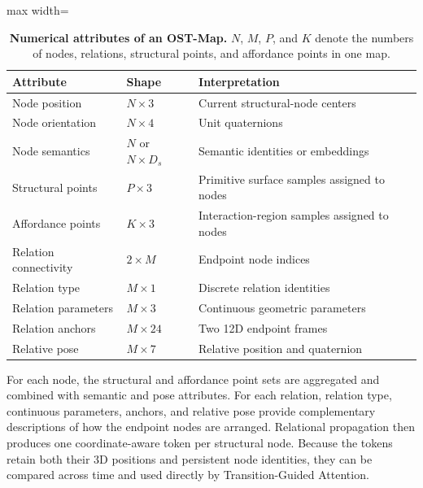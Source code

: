 \begin{table}[t]
    \centering
    \caption{\textbf{Numerical attributes of an OST-Map.}
    $N$, $M$, $P$, and $K$ denote the numbers of nodes, relations, structural
    points, and affordance points in one map.}
    \label{tab:ost_map_tensor_layout}
    \vspace{2pt}
    \small
    \setlength{\tabcolsep}{5pt}
    \begin{adjustbox}{max width=\columnwidth}
    \begin{tabular}{lll}
        \toprule
        Attribute & Shape & Interpretation \\
        \midrule
        Node position & $N\times3$ & Current structural-node centers \\
        Node orientation & $N\times4$ & Unit quaternions \\
        Node semantics & $N$ or $N\times D_s$
        & Semantic identities or embeddings \\
        Structural points & $P\times3$
        & Primitive surface samples assigned to nodes \\
        Affordance points & $K\times3$
        & Interaction-region samples assigned to nodes \\
        Relation connectivity & $2\times M$ & Endpoint node indices \\
        Relation type & $M\times1$ & Discrete relation identities \\
        Relation parameters & $M\times3$ & Continuous geometric parameters \\
        Relation anchors & $M\times24$ & Two 12D endpoint frames \\
        Relative pose & $M\times7$ & Relative position and quaternion \\
        \bottomrule
    \end{tabular}
    \end{adjustbox}
\end{table}

For each node, the structural and affordance point sets are aggregated and
combined with semantic and pose attributes. For each relation, relation type,
continuous parameters, anchors, and relative pose provide complementary
descriptions of how the endpoint nodes are arranged. Relational propagation
then produces one coordinate-aware token per structural node. Because the
tokens retain both their 3D positions and persistent node identities, they can
be compared across time and used directly by Transition-Guided Attention.

